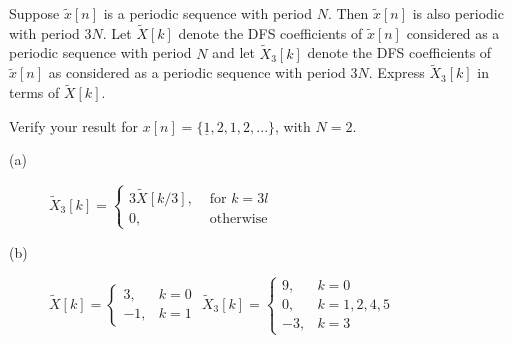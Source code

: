 \documentclass[11pt]{article}
\begin{document}
Suppose $\tilde{x}[n]$ is a periodic sequence with period $N$. Then $\tilde{x}[n]$ is also periodic with period $3N$. Let $\tilde{X}[k]$ denote the DFS coefficients of $\tilde{x}[n]$ considered as a periodic sequence with period $N$ and let $\tilde{X}_3[k]$ denote the DFS coefficients of $\tilde{x}[n]$ as considered as a periodic sequence with period $3N$. Express $\tilde{X}_3[k]$ in terms of $\tilde{X}[k]$.

Verify your result for $x[n]=\{\underline{1},2,1,2,...\}$, with $N=2$.

{\color{blue}
\begin{description}
\item[(a)] $\tilde{X}_3[k]=\begin{cases} 3\tilde{X}[k/3], & \text{ for }k = 3l\\0, & \text{ otherwise } \end{cases} $
\item[(b)] $\tilde{X}[k]=\begin{cases} 3, & k = 0 \\-1, & k = 1 \end{cases} $ \quad 
$\tilde{X}_3[k]=\begin{cases} 9, & k = 0 \\ 0, & k =1,2,4,5 \\-3, & k =3 \end{cases} $
\end{description}
}



{\color{blue}

}
\end{document}
